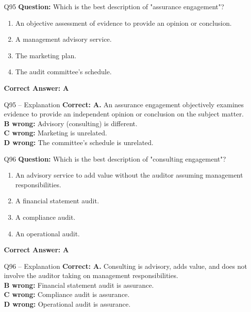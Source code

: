 \documentclass[aspectratio=169,10pt]{beamer}
\begin{document}
	\begin{frame}[t]{Q95}
		\small
		\textbf{Question:} Which is the best description of "assurance engagement"?
		\begin{enumerate}[label=\Alph*.,itemsep=1pt,topsep=2pt]
			\item An objective assessment of evidence to provide an opinion or conclusion.
			\item A management advisory service.
			\item The marketing plan.
			\item The audit committee's schedule.
		\end{enumerate}
		\vspace{4pt}
		\textbf{Correct Answer: A}
	\end{frame}
	
	\begin{frame}[t]{Q95 -- Explanation}
		\small
		\textbf{Correct: A.} An assurance engagement objectively examines evidence to provide an independent opinion or conclusion on the subject matter. \\[4pt]
		\textbf{B wrong:} Advisory (consulting) is different. \\[2pt]
		\textbf{C wrong:} Marketing is unrelated. \\[2pt]
		\textbf{D wrong:} The committee's schedule is unrelated.
	\end{frame}
	
	\begin{frame}[t]{Q96}
		\small
		\textbf{Question:} Which is the best description of "consulting engagement"?
		\begin{enumerate}[label=\Alph*.,itemsep=1pt,topsep=2pt]
			\item An advisory service to add value without the auditor assuming management responsibilities.
			\item A financial statement audit.
			\item A compliance audit.
			\item An operational audit.
		\end{enumerate}
		\vspace{4pt}
		\textbf{Correct Answer: A}
	\end{frame}
	
	\begin{frame}[t]{Q96 -- Explanation}
		\small
		\textbf{Correct: A.} Consulting is advisory, adds value, and does not involve the auditor taking on management responsibilities. \\[4pt]
		\textbf{B wrong:} Financial statement audit is assurance. \\[2pt]
		\textbf{C wrong:} Compliance audit is assurance. \\[2pt]
		\textbf{D wrong:} Operational audit is assurance.
	\end{frame}
	
\end{document}

